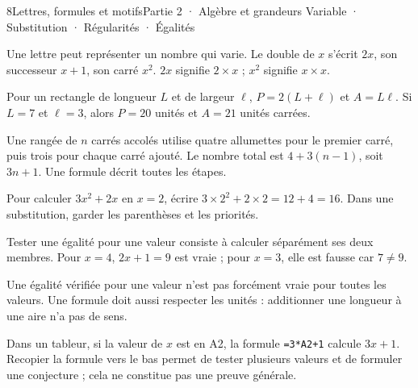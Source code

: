 \begin{ouverture}[calcul]{8}{Lettres, formules et motifs}{Partie 2 · Algèbre et grandeurs}
{Variable · Substitution · Régularités · Égalités}
\end{ouverture}
\pagestyle{otMain}\essentiel\fontsize{11}{15}\selectfont
{}\label{cours-8-1}
\begin{definition}Une lettre peut représenter un nombre qui varie. Le double de $x$ s’écrit $2x$, son successeur $x+1$, son carré $x^2$. $2x$ signifie $2\times x$ ; $x^2$ signifie $x\times x$.\end{definition}
\begin{exemple}Pour un rectangle de longueur $L$ et de largeur $\ell$, $P=2(L+\ell)$ et $A=L\ell$. Si $L=7$ et $\ell=3$, alors $P=20$ unités et $A=21$ unités carrées.\end{exemple}
\label{fig-cours-8-1-cours-motif}

\begin{savoirfaire}Une rangée de $n$ carrés accolés utilise quatre allumettes pour le premier carré, puis trois pour chaque carré ajouté. Le nombre total est $4+3(n-1)$, soit $3n+1$. Une formule décrit toutes les étapes.\end{savoirfaire}
\clearpage
{}\label{cours-8-2}
\begin{savoirfaire}Pour calculer $3x^2+2x$ en $x=2$, écrire $3\times2^2+2\times2=12+4=16$. Dans une substitution, garder les parenthèses et les priorités.\end{savoirfaire}
\begin{definition}Tester une égalité pour une valeur consiste à calculer séparément ses deux membres. Pour $x=4$, $2x+1=9$ est vraie ; pour $x=3$, elle est fausse car $7\ne9$.\end{definition}
\begin{attention}Une égalité vérifiée pour une valeur n’est pas forcément vraie pour toutes les valeurs. Une formule doit aussi respecter les unités : additionner une longueur à une aire n’a pas de sens.\end{attention}
\begin{savoirfaire}Dans un tableur, si la valeur de $x$ est en A2, la formule \texttt{=3*A2+1} calcule $3x+1$. Recopier la formule vers le bas permet de tester plusieurs valeurs et de formuler une conjecture ; cela ne constitue pas une preuve générale.\end{savoirfaire}

